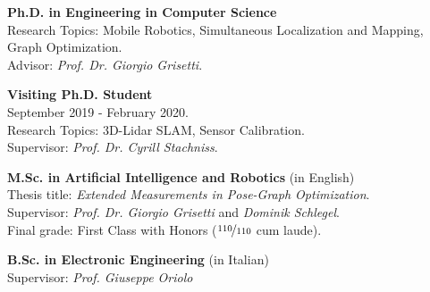 \documentclass[a4paper,12pt]{memoir} %
\begin{document}
\userinformation 
\framebreak 



  {\textbf{Ph.D. in Engineering in Computer Science} \\
    Research Topics: Mobile Robotics, Simultaneous Localization and Mapping, 
    Graph Optimization.\\
    Advisor: \textit{Prof. Dr. Giorgio Grisetti}.}

{\textbf{Visiting Ph.D. Student} \\
  September 2019 - February 2020. \\
  Research Topics: 3D-Lidar SLAM, Sensor Calibration.\\
  Supervisor: \textit{Prof. Dr. Cyrill Stachniss}.}

  {\textbf{M.Sc. in Artificial Intelligence and Robotics} (in English) \\
  Thesis title: \textit{Extended Measurements in Pose-Graph Optimization}. \\
  Supervisor: \textit{Prof. Dr. Giorgio Grisetti} and \textit{Dominik 
  Schlegel}. \\
  Final grade: First Class with Honors ($\nicefrac{110}{110}$ cum laude).}

  {\textbf{B.Sc. in Electronic Engineering} (in Italian) \\
  Supervisor: \textit{Prof. Giuseppe Oriolo}}

\Sep %
\Sep %

\end{document}
